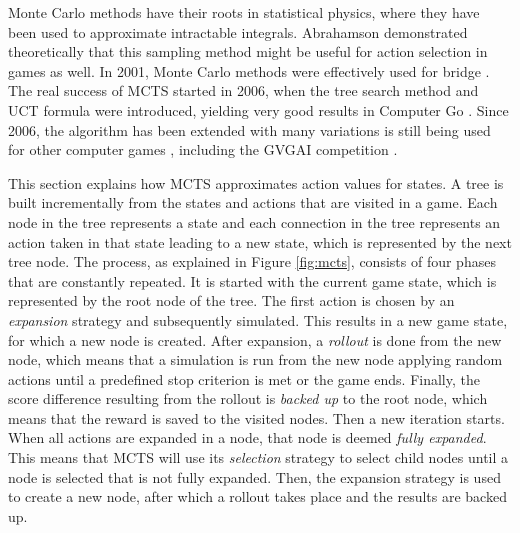 \label{subsec:mcts}
Monte Carlo methods have their roots in statistical physics, where they have
been used to approximate intractable integrals. Abrahamson
\cite{abramson1990expected} demonstrated theoretically that this sampling method might be
useful for action selection in games as well.  In 2001, Monte Carlo methods were
effectively used for bridge \cite{ginsberg2001gib}. The real success of MCTS
started in 2006, when the tree search method and UCT formula were introduced,
yielding very good results in Computer Go \cite{gelly2006modification}. Since
2006, the algorithm has been extended with many variations is still being used
for other computer games \cite{browne2012survey}, including the GVGAI
competition \cite{perez2014knowledge}.

This section explains how MCTS approximates action values for states.  A tree is
built incrementally from the states and actions that are visited in a game. Each
node in the tree represents a state and each connection in the tree represents
an action taken in that state leading to a new state, which is represented by
the next tree node.  The process, as explained in Figure \ref{fig:mcts},
consists of four phases that are constantly repeated. It is started with the
current game state, which is represented by the root node of the tree. The first
action is chosen by an \emph{expansion} strategy and subsequently simulated.
This results in a new game state, for which a new node is created. After
expansion, a \emph{rollout} is done from the new node, which means that a
simulation is run from the new node applying random actions until a predefined
stop criterion is met or the game ends. Finally, the score difference resulting
from the rollout is \emph{backed up} to the root node, which means that the
reward is saved to the visited nodes.  Then a new iteration starts. When all
actions are expanded in a node, that node is deemed \emph{fully expanded}.
This means that MCTS will use its \emph{selection} strategy to select child
nodes until a node is selected that is not fully expanded.  Then, the expansion
strategy is used to create a new node, after which a rollout takes place and the
results are backed up.

